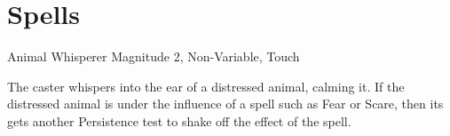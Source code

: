 





\section{Spells}

\begin{rpg-spell}
{Animal Whisperer}
{Magnitude 2, Non-Variable, Touch}

The caster whispers into the ear of a distressed animal, calming it. If the distressed animal is under the influence of a spell such as Fear or Scare, then its gets another Persistence test to shake off the effect of the spell.
\end{rpg-spell}

